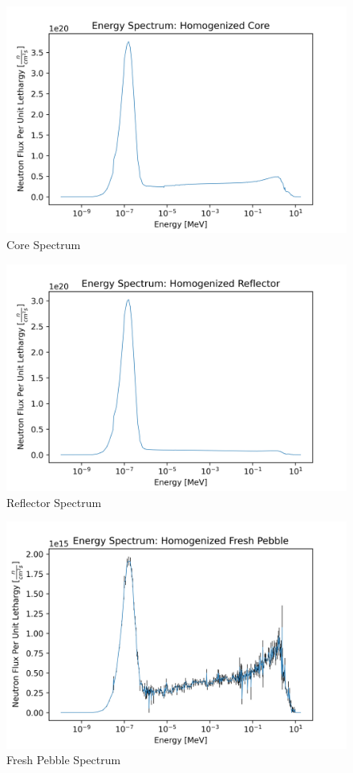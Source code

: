 \begin{figure}[H]
\centering
  \includegraphics[width=0.95\linewidth]{figures/core_spec_homog}
  \caption{Core Spectrum}
  \label{fig:hom-core}
\end{figure}

\begin{figure}[H]
\centering
  \includegraphics[width=0.95\linewidth]{figures/reflect_spec_homog}
  \caption{Reflector Spectrum}
  \label{fig:hom-reflec}
\end{figure}

\begin{figure}[H]
\centering
  \includegraphics[width=0.95\linewidth]{figures/fresh_spec_homog}
  \caption{Fresh Pebble Spectrum}
  \label{fig:hom-fresh}
\end{figure}

